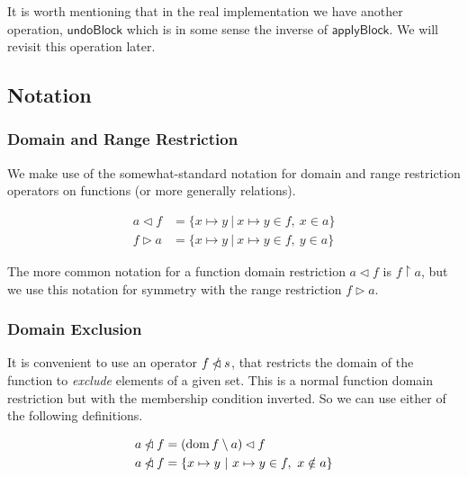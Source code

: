 \documentclass{article}
\DeclareMathOperator{\dom}{dom}
\newcommand{\restrictdom}{\lhd}
\newcommand{\subtractdom}{\mathbin{\slashed{\restrictdom}}}
\newcommand{\restrictrange}{\rhd}
\begin{document}
It is worth mentioning that in the real implementation we have another
operation, $\mathsf{undoBlock}$ which is in some sense the inverse of
$\mathsf{applyBlock}$. We will revisit this operation later.


\subsection{Notation}

\subsubsection{Domain and Range Restriction}

We make use of the somewhat-standard notation for domain and range restriction
operators on functions (or more generally relations).

\begin{equation*}
\begin{split}
a \restrictdom  f  & = \{ x \mapsto y ~|~ x \mapsto y \in f, ~ x \in a \} \\
f \restrictrange a  & = \{ x \mapsto y ~|~ x \mapsto y \in f, ~ y \in a \}
\end{split}
\end{equation*}

The more common notation for a function domain restriction $a \restrictdom f$
is $f \restriction a$, but we use this notation for symmetry with the range
restriction $f \restrictrange a$.

\subsubsection{Domain Exclusion}

It is convenient to use an operator $f \subtractdom s$, that restricts the
domain of the function to \emph{exclude} elements of a given set. This is a
normal function domain restriction but with the membership condition inverted.
So we can use either of the following definitions.

\begin{equation*}
\begin{split}
a \subtractdom f  & = ( \dom f \setminus a ) \restrictdom f \\
a \subtractdom f  & = \{ x \mapsto y ~|~ x \mapsto y \in f, ~ x \notin a \}
\end{split}
\end{equation*}
\end{document}
